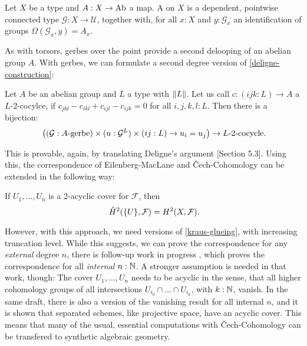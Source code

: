 \begin{definition}
  \label{gerbe}
  Let $X$ be a type and $A:X\to \operatorname{Ab}$ a map.
  A  on $X$ is a dependent, pointwise connected type $\mathcal G:X\to \mathcal U$,
  together with, for all $x:X$ and $y:\mathcal G_x$ an identification of groups $\Omega (\mathcal G_x,y)=A_x$.
\end{definition}

As with torsors, gerbes over the point provide a second delooping of an abelian group $A$.
With gerbes, we can formulate a second degree version of \cref{deligne-construction}:

\begin{theorem}
  \label{deligne-construction-gerbes}
  Let $A$ be an abelian group and $L$ a type with $\lVert L \rVert$.
  Let us call $c:(i j k : L)\to A$ a $L$-2-cocylce,
  if $c_{jkl}-c_{ikl}+c_{ijl}-c_{ijk}=0$ for all $i,j,k,l : L$.
  Then there is a bijection:
  \[
    \left((\mathcal G:\text{$A$-gerbe})\times (u:\mathcal G^{L})\times (i j : L) \to u_i=u_j\right) \to \text{$L$-2-cocycle}
    \rlap{.}
  \]
\end{theorem}

This is provable, again, by translating Deligne's argument \cite{Deligne91}[Section 5.3].
Using this, the correspondence of Eilenberg-MacLane and \v{C}ech-Cohomology can be extended in the following way:

\begin{theorem}
  If $U_1,\dots,U_n$ is a 2-acyclic cover for $\mathcal F$, then
  \[
    \check{H}^2(\{U\},\mathcal F)=H^2(X,\mathcal F)\rlap{.}
  \]  
\end{theorem}

However, with this approach, we need versions of \cref{kraus-glueing}, with increasing truncation level.
While this suggests, we can prove the correspondence for any \emph{external} degree $n$,
there is follow-up work in progress \cite{chech-draft},
which proves the correspondence for all \emph{internal} $n:\mathbb{N}$.
A stronger assumption is needed in that work, though: The cover $U_1,\dots,U_n$ needs to be acyclic in the sense,
that all higher cohomology groups of all intersections $U_{i_0}\cap \dots \cap U_{i_k}$, with $k:\mathbb{N}$, vanish.
In the same draft, there is also a version of the vanishing result for all internal $n$,
and it is shown that separated schemes, like projective space, have an acyclic cover.
This means that many of the usual, essential computations with \v{C}ech-Cohomology can be transfered to synthetic algebraic geometry.